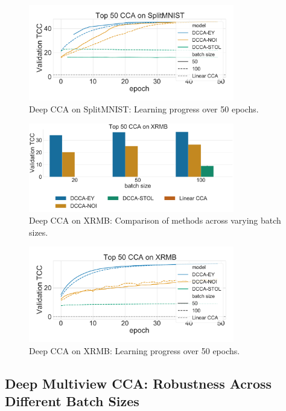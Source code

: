 \begin{figure}
    \centering
    \includegraphics[width=0.8\textwidth]{figures/DCCA/SplitMNIST_allbatchsizes_pcc}
    \caption{Deep CCA on SplitMNIST: Learning progress over 50 epochs.}
    \label{fig:lr_mnist}
\end{figure}

\begin{figure}
    \centering
    \includegraphics[width=0.8\textwidth]{figures/DCCA/XRMB_models_different_batch_sizes}
    \caption{Deep CCA on XRMB: Comparison of methods across varying batch sizes.}
    \label{fig:corr_xrmb}
\end{figure}

\begin{figure}
    \centering
    \includegraphics[width=0.8\textwidth]{figures/DCCA/XRMB_allbatchsizes_pcc}
    \caption{Deep CCA on XRMB: Learning progress over 50 epochs.}
    \label{fig:lr_xrmb}
\end{figure}

\subsection{Deep Multiview CCA: Robustness Across Different Batch Sizes}

